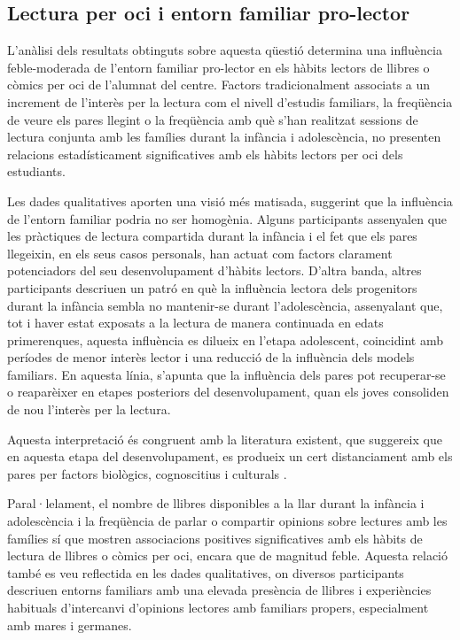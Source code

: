 \documentclass[12pt]{article}
\begin{document}
\subsection{Lectura per oci i entorn familiar pro-lector}
L'anàlisi dels resultats obtinguts sobre aquesta qüestió determina una influència feble-moderada de l'entorn familiar pro-lector en els hàbits lectors de llibres o còmics per oci de l'alumnat del centre. Factors tradicionalment associats a un increment de l'interès per la lectura com el nivell d'estudis familiars, la freqüència de veure els pares llegint o la freqüència amb què s'han realitzat sessions de lectura conjunta amb les famílies durant la infància i adolescència, no presenten relacions estadísticament significatives amb els hàbits lectors per oci dels estudiants.

Les dades qualitatives aporten una visió més matisada, suggerint que la influència de l’entorn familiar podria no ser homogènia. Alguns participants assenyalen que les pràctiques de lectura compartida durant la infància i el fet que els pares llegeixin, en els seus casos personals, han actuat com factors clarament potenciadors del seu desenvolupament d’hàbits lectors. D'altra banda, altres participants descriuen un patró en què la influència lectora dels progenitors durant la infància sembla no mantenir-se durant l'adolescència, assenyalant que, tot i haver estat exposats a la lectura de manera continuada en edats primerenques, aquesta influència es dilueix en l’etapa adolescent, coincidint amb períodes de menor interès lector i una reducció de la influència dels models familiars. En aquesta línia, s’apunta que la influència dels pares pot recuperar-se o reaparèixer en etapes posteriors del desenvolupament, quan els joves consoliden de nou l’interès per la lectura.

Aquesta interpretació és congruent amb la literatura existent, que suggereix que en aquesta etapa del desenvolupament, es produeix un cert distanciament  amb els pares per factors biològics, cognoscitius i culturals \parencite{arnett}.

Paral·lelament, el nombre de llibres disponibles a la llar durant la infància i adolescència i la freqüència de parlar o compartir opinions sobre lectures amb les famílies sí que mostren associacions positives significatives amb els hàbits de lectura de llibres o còmics per oci, encara que de magnitud feble. Aquesta relació també es veu reflectida en les dades qualitatives, on diversos participants descriuen entorns familiars amb una elevada presència de llibres i experiències habituals d'intercanvi d'opinions lectores amb familiars propers, especialment amb mares i germanes.
\end{document}
